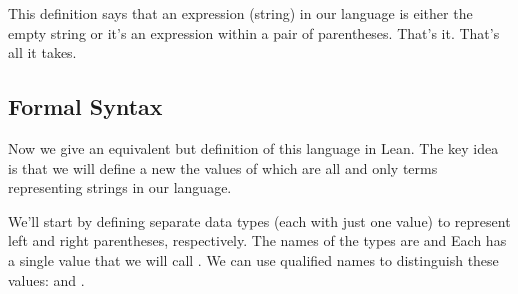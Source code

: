 \documentclass[letterpaper,10pt,english]{sphinxmanual}
\begin{document}
\sphinxAtStartPar
This definition says that an expression (string) in our
language is either the empty string or it’s an expression
within a pair of parentheses. That’s it. That’s all it takes.


\subsection{Formal Syntax}
\label{\detokenize{A_01_Propositional_Logic:formal-syntax}}
\sphinxAtStartPar
Now we give an equivalent but  definition
of this language in Lean. The key idea is that we will define
a new  the values of which are all and only terms
representing strings in our language.

\sphinxAtStartPar
We’ll start by defining separate data types (each with just
one value) to represent left and right parentheses, respectively.
The names of the types are  and  Each has a
single value that we will call . We can use qualified names
to distinguish these values:  and .
\end{document}
